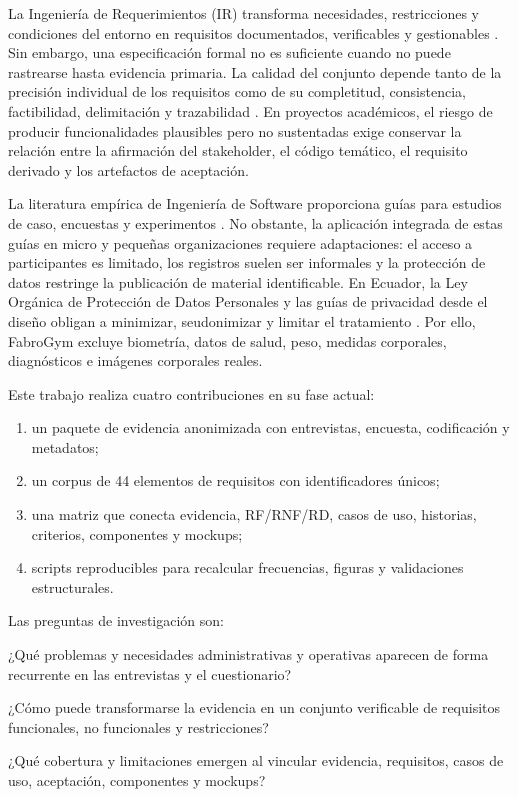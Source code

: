 \documentclass[11pt,a4paper]{article}
\begin{document}
La Ingeniería de Requerimientos (IR) transforma necesidades, restricciones y condiciones del entorno en requisitos documentados, verificables y gestionables \cite{iso29148,pohl2010,swebok2024}. Sin embargo, una especificación formal no es suficiente cuando no puede rastrearse hasta evidencia primaria. La calidad del conjunto depende tanto de la precisión individual de los requisitos como de su completitud, consistencia, factibilidad, delimitación y trazabilidad \cite{iso29148,montgomery2022}. En proyectos académicos, el riesgo de producir funcionalidades plausibles pero no sustentadas exige conservar la relación entre la afirmación del stakeholder, el código temático, el requisito derivado y los artefactos de aceptación.

La literatura empírica de Ingeniería de Software proporciona guías para estudios de caso, encuestas y experimentos \cite{runeson2009,wohlin2012,molleri2020}. No obstante, la aplicación integrada de estas guías en micro y pequeñas organizaciones requiere adaptaciones: el acceso a participantes es limitado, los registros suelen ser informales y la protección de datos restringe la publicación de material identificable. En Ecuador, la Ley Orgánica de Protección de Datos Personales y las guías de privacidad desde el diseño obligan a minimizar, seudonimizar y limitar el tratamiento \cite{lopdp2021,spdp2025,spdp2026}. Por ello, FabroGym excluye biometría, datos de salud, peso, medidas corporales, diagnósticos e imágenes corporales reales.

Este trabajo realiza cuatro contribuciones en su fase actual:
\begin{enumerate}[label=\arabic*)]
\item un paquete de evidencia anonimizada con entrevistas, encuesta, codificación y metadatos;
\item un corpus de 44 elementos de requisitos con identificadores únicos;
\item una matriz que conecta evidencia, RF/RNF/RD, casos de uso, historias, criterios, componentes y mockups;
\item scripts reproducibles para recalcular frecuencias, figuras y validaciones estructurales.
\end{enumerate}

Las preguntas de investigación son:
\begin{description}[leftmargin=1.25cm]
\item[RQ1.] ¿Qué problemas y necesidades administrativas y operativas aparecen de forma recurrente en las entrevistas y el cuestionario?
\item[RQ2.] ¿Cómo puede transformarse la evidencia en un conjunto verificable de requisitos funcionales, no funcionales y restricciones?
\item[RQ3.] ¿Qué cobertura y limitaciones emergen al vincular evidencia, requisitos, casos de uso, aceptación, componentes y mockups?
\end{description}
\end{document}
